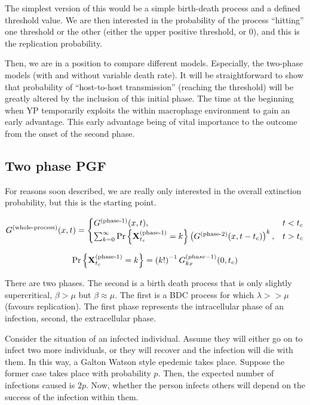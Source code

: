 The simplest version of this would be a simple birth-death process and a defined threshold value.  We are then interested in the probability of the process ``hitting'' one threshold or the other (either the upper positive threshold, or 0), and this is the replication probability.\par

Then, we are in a position to compare different models. Especially, the two-phase models (with and without variable death rate). It will be straightforward to show that probability of ``host-to-host transmission''  (reaching the threshold) will be greatly altered by the inclusion of this initial phase. The time at the beginning when YP temporarily exploits the within macrophage environment to gain an early advantage. This early advantage being of vital importance to the outcome from the onset of the second phase. 



\subsection{Two phase PGF}

For reasons soon described, we are really only interested in the overall extinction probability, but this is the starting point. 


$$G^{(\text{whole-process})}(x,t)    = \begin{cases}
G^{(\text{phase-1})}(x,t), & t< t_c\\
\sum_{k=0}^\infty   {\text{Pr}\left\{{\bf X}_{t_c}^{(\text{phase-1})} = k\right\}} \left( G^{(\text{phase-2})}(x,t-t_c)\right)^k, & t>t_c
\end{cases} 
$$


$$ {\text{Pr}\left\{{\bf X}_{t_c}^{(\text{phase-1})} = k\right\}}   =  \left( k!\right)^{-1}  G^{(phase-1)}_{kx}(0, t_c)$$




There are two phases. The second is a birth death process that is only slightly supercritical, $\beta > \mu$ but $\beta \approx \mu$. The first is a BDC process for which $\lambda >> \mu$ (favours replication). The first phase represents the intracellular phase of an infection, second, the extracellular phase.\par

Consider the situation of an infected individual. Assume they will either go on to infect two more individuals, or they will recover and the infection will die with them. In this way, a Galton Watson style epedemic takes place. Suppose the former case takes place with probability $p$. Then, the expected number of infections caused is $2p$. Now, whether the person infects others will depend on the success of the infection within them.\par


